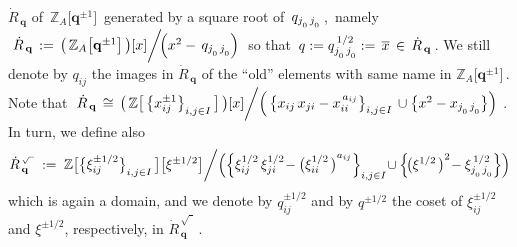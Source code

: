 \documentclass[12pt,reqno,twoside,a4paper]{amsart}
\numberwithin{equation}{section}
\theoremstyle{definition}
\newtheorem{free text}[lema]{}
\theoremstyle{remark}
\def \bq {\mathbf{q}}
\def \QQ{\mathbb{Q}}
\def \ZZ {\mathbb{Z}}
\def \Zabqpm {{\ZZ_A\big[\bq^{\pm 1}\big]}}
\def \Qabq {\QQ_A(\bq\hskip1,7pt)}
\def \dotRbq {{\dot{R}_{\,\bq}}}
\def \dotRbqsq {{\dot{R}_{\,\bq}^{\,\scriptscriptstyle {\sqrt{\phantom{I}}}}}}
\theoremstyle{plain}
\begin{document}
   $ \dotRbq $  of  $ \, \Zabqpm \, $  generated by a square root of
   $ \, q_{j_{\raise-2pt\hbox{$ \scriptscriptstyle 0 $}} \,
   j_{\raise-2pt\hbox{$ \scriptscriptstyle 0 $}}} \, $,  \,namely
%
  $ \; \dotRbq \, := \, \big(\, \Zabqpm \,\big)[x] \bigg/\! \Big( x^2 - \,
  q_{j_{\raise-2pt\hbox{$ \scriptscriptstyle 0 $}} \,
  j_{\raise-2pt\hbox{$ \scriptscriptstyle 0 $}}} \Big) \; $  so that
  $ \, q := q_{j_{\raise-2pt\hbox{$ \scriptscriptstyle 0 $}} \,
  j_{\raise-2pt\hbox{$ \scriptscriptstyle 0 $}}}^{\,1/2} := \,
  \overline{x} \, \in \, \dotRbq \, $.
%
 We still denote by  $ q_{ij} $  the images in  $ \dotRbq $
%
%
 of the ``old'' elements with same name in  $ \Zabqpm \, $.
%
%
 Note that
%
  $ \; \dotRbq \, \cong \, \big(\, \ZZ\big[\, {\big\{ x_{ij}^{\pm 1} \big\}}_{i, j \in I} \,\big] \,\big)[x] \bigg/ \Big(\, {\big\{ x_{ij} \, x_{ji} - x_{ii}^{\,a_{ij}} \big\}}_{i, j \in I} \, \cup \big\{ x^2 - x_{j_{\raise-2pt\hbox{$ \scriptscriptstyle 0 $}} \, j_{\raise-2pt\hbox{$ \scriptscriptstyle 0 $}}} \big\} \Big) \; $.
%
%
 In turn, we define also
%
  $$
  \dotRbqsq  \; := \;  \ZZ\big[ {\big\{ \xi_{ij}^{\pm 1/2} \big\}}_{i, j \in I}
  \,\big]\big[ \xi^{\pm 1/2} \big] \bigg/
   \Big( {\Big\{ \xi_{ij}^{1/2} \, \xi_{ji}^{1/2} \! -
   {\big( \xi_{i{}i}^{1/2\,} \big)}^{a_{ij}} \Big\}}_{i, j \in I} \! \cup
   \Big\{\! {\big(\xi^{1/2\,}\big)}^2 \! -
   \xi_{j_{\raise-2pt\hbox{$ \scriptscriptstyle 0 $}} \,
   j_{\raise-2pt\hbox{$ \scriptscriptstyle 0 $}}}^{\,1/2} \Big\} \Big)
   $$
%
 \vskip0pt
%
\noindent
 which is again a domain,
%
%
 and we denote by  $ q_{ij}^{\pm 1/2} $  and by  $ q^{\pm 1/2} $  the coset of
 $ \xi_{ij}^{\pm 1/2} $  and  $ \xi^{\pm 1/2} $,  respectively, in  $ \dotRbqsq \, $.
%
\end{document}
